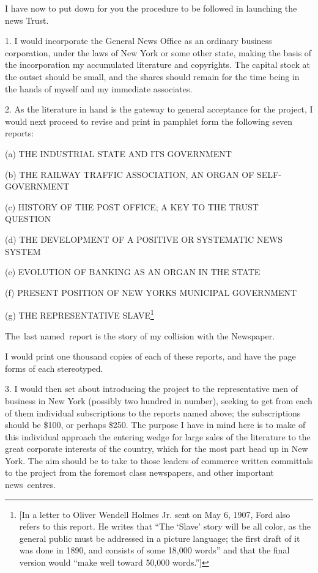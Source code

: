 \documentclass[openany,nobib]{tufte-book}
\begin{document}
I have now to put down for you the procedure to be followed in launching
the news Trust.~

1. I would incorporate the General News Office as an ordinary business
corporation, under the laws of New York or some other state, making the
basis of the incorporation my accumulated literature and copyrights. The
capital stock at the outset should be small, and the shares should
remain for the time being in the hands of myself and my immediate
associates.~~

2. As the literature in hand is the gateway to general acceptance for
the project, I would next proceed to revise and print in pamphlet form
the following seven reports:~

\vspace{0.1in}

\begin{hangparas}{.25in}{1} 

(a) THE INDUSTRIAL STATE AND ITS GOVERNMENT~

(b) THE RAILWAY TRAFFIC ASSOCIATION, AN ORGAN OF SELF-GOVERNMENT~

(c) HISTORY OF THE POST OFFICE; A KEY TO THE TRUST QUESTION~~~

(d) THE DEVELOPMENT OF A POSITIVE OR SYSTEMATIC NEWS SYSTEM~~

(e) EVOLUTION OF BANKING AS AN ORGAN IN THE STATE~

(f) PRESENT POSITION OF NEW YORK\textquotesingle S MUNICIPAL
GOVERNMENT~~

(g) THE REPRESENTATIVE SLAVE\footnote{{[}In a letter to Oliver Wendell
  Holmes Jr. sent on May 6, 1907, Ford also refers to this report. He
  writes that ``The `Slave' story will be all color, as the general
  public must be addressed in a picture language; the first draft of it
  was done in 1890, and consists of some 18,000 words'' and that the
  final version would ``make well toward 50,000 words.''{]}}~

\end{hangparas}

\vspace{0.1in}


The~last named~report is the story of my collision with the Newspaper.~~

I would print one thousand copies of each of these reports, and have the
page forms of each stereotyped.~

3. I would then set about introducing the project to the representative
men of business in New York (possibly two hundred in number), seeking to
get from each of them individual subscriptions to the reports named
above; the subscriptions should be \$100, or perhaps \$250. The purpose
I have in mind here is to make of this individual approach the entering
wedge for large sales of the literature to the great corporate interests
of the country, which for the most part head up in New York. The aim
should be to take to those leaders of commerce written committals to the
project from the foremost class newspapers, and other important
news~centres.~
\end{document}
